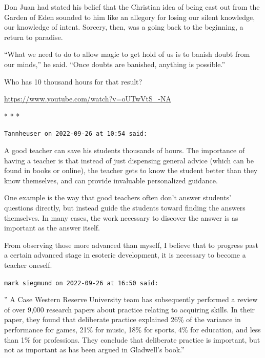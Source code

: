 \begin{quotex}
Don Juan had stated his belief that the Christian idea of being cast out from the Garden of Eden sounded to him like an allegory for losing our silent knowledge, our knowledge of intent. Sorcery, then, was a going back to the beginning, a return to paradise.

``What we need to do to allow magic to get hold of us is to banish doubt from our minds,'' he said. ``Once doubts are banished, anything is possible.''
\end{quotex}


Who has 10 thousand hours for that result?

\url{https://www.youtube.com/watch?v=oUTwVtS\_-NA}


\begin{center}* * *\end{center}

\begin{footnotesize}
\begin{sffamily}
\texttt{Tannheuser on 2022-09-26 at 10:54 said:}

A good teacher can save his students thousands of hours. The importance of having a teacher is that instead of just dispensing general advice (which can be found in books or online), the teacher gets to know the student better than they know themselves, and can provide invaluable personalized guidance.

One example is the way that good teachers often don't answer students' questions directly, but instead guide the students toward finding the answers themselves. In many cases, the work necessary to discover the answer is as important as the answer itself.

From observing those more advanced than myself, I believe that to progress past a certain advanced stage in esoteric development, it is necessary to become a teacher oneself.

\hfill

\texttt{mark siegmund on 2022-09-26 at 16:50 said:}

'' A Case Western Reserve University team has subsequently performed a review of over 9,000 research papers about practice relating to acquiring skills. In their paper, they found that deliberate practice explained 26\% of the variance in performance for games, 21\% for music, 18\% for sports, 4\% for education, and less than 1\% for professions. They conclude that deliberate practice is important, but not as important as has been argued in Gladwell's book.''


\hfill

\end{sffamily}
\end{footnotesize}


